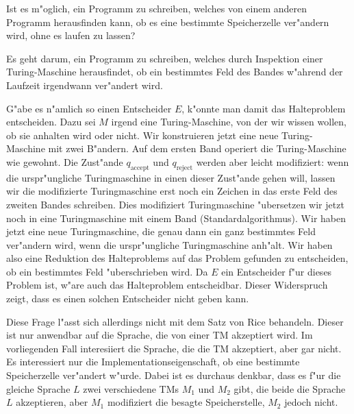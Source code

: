 Ist es m"oglich, ein Programm zu schreiben, welches von einem anderen
Programm herausfinden kann, ob es eine bestimmte Speicherzelle
ver"andern wird, ohne es laufen zu lassen?

\begin{loesung}
Es geht darum, ein Programm zu schreiben, welches durch Inspektion
einer Turing-Maschine herausfindet, ob ein bestimmtes Feld des
Bandes w"ahrend der Laufzeit irgendwann ver"andert wird.

G"abe es n"amlich so einen Entscheider $E$, k"onnte man damit das Halteproblem
entscheiden. Dazu sei $M$ irgend eine Turing-Maschine, von der wir
wissen wollen, ob sie anhalten wird oder nicht.
Wir konstruieren jetzt eine neue Turing-Maschine mit zwei
B"andern. Auf dem ersten Band operiert die Turing-Maschine
wie gewohnt.
Die Zust"ande $q_\text{accept}$ und $q_\text{reject}$ werden
aber leicht modifiziert: wenn die urspr"ungliche Turingmaschine 
in einen dieser Zust"ande gehen will, lassen wir die modifizierte
Turingmaschine erst noch ein Zeichen in das erste Feld des zweiten
Bandes schreiben. Dies modifiziert Turingmaschine "ubersetzen wir jetzt noch
in eine Turingmaschine mit einem Band (Standardalgorithmus). Wir haben
jetzt eine neue Turingmaschine, die genau dann ein ganz bestimmtes
Feld ver"andern wird, wenn die urspr"ungliche Turingmaschine
anh"alt. Wir haben also eine Reduktion des Halteproblems auf das
Problem gefunden zu entscheiden, ob ein bestimmtes Feld "uberschrieben
wird. Da $E$ ein Entscheider f"ur dieses Problem ist, w"are auch das
Halteproblem entscheidbar. Dieser Widerspruch zeigt, dass es einen
solchen Entscheider nicht geben kann.

Diese Frage l"asst sich allerdings nicht mit dem Satz von Rice 
behandeln. Dieser ist nur anwendbar auf die Sprache, die von einer
TM akzeptiert wird. Im vorliegenden Fall interesiiert die Sprache,
die die TM akzeptiert, aber gar nicht.
Es interessiert nur die Implementationseigenschaft, ob eine
bestimmte Speicherzelle ver"andert w"urde.
Dabei ist es durchaus denkbar, dass es f"ur die gleiche Sprache $L$
zwei verschiedene TMs $M_1$ und $M_2$ gibt, die beide die Sprache $L$
akzeptieren, aber $M_1$ modifiziert die besagte Speicherstelle, $M_2$
jedoch nicht.
\end{loesung}
